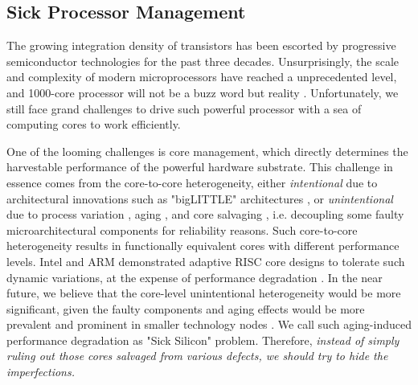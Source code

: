 \subsection{Sick Processor Management}
The growing integration density of transistors has been escorted by progressive semiconductor technologies for the past three decades. Unsurprisingly, the scale and complexity of modern microprocessors have reached a unprecedented level, and 1000-core processor will not be a buzz word but reality \cite{thousandcore}.  Unfortunately, we still face grand challenges to drive such powerful processor with a sea of computing cores to work efficiently.

One of the looming challenges is core management, which directly determines the harvestable performance of the powerful hardware substrate.  This challenge in essence comes from the core-to-core heterogeneity, either \emph{intentional} due to architectural innovations such as "bigLITTLE" architectures \cite{biglittle}, or \emph{unintentional} due to process variation \cite{variation_jssc02} \cite{ParameterVariations_DAC03}, aging \cite{ImpactTechnologyScaling_04} \cite{aging_iedm} \cite{degradation_05} \cite{ReviveNet}, and core salvaging \cite{redundancy_iccd} \cite{WearoutRecovery_08}, i.e. decoupling some faulty microarchitectural components for reliability reasons. Such core-to-core heterogeneity results in functionally equivalent cores with different performance levels. Intel and ARM demonstrated adaptive RISC core designs to tolerate such dynamic variations, at the expense of performance degradation \cite{adaptive-core} \cite{arm-timing-error}. In the near future, we believe that the core-level unintentional heterogeneity would be more significant, given the faulty components and aging effects would be more prevalent and prominent in smaller technology nodes \cite{degradation_05}.  We call such aging-induced performance degradation as "Sick Silicon" problem. Therefore, \emph{instead of simply ruling out those cores salvaged from various defects, we should try to hide the imperfections.}

